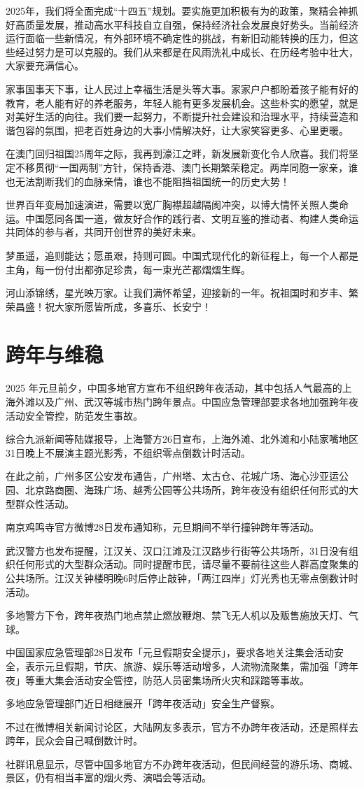 2025年，我们将全面完成“十四五”规划。要实施更加积极有为的政策，聚精会神抓好高质量发展，推动高水平科技自立自强，保持经济社会发展良好势头。当前经济运行面临一些新情况，有外部环境不确定性的挑战，有新旧动能转换的压力，但这些经过努力是可以克服的。我们从来都是在风雨洗礼中成长、在历经考验中壮大，大家要充满信心。

家事国事天下事，让人民过上幸福生活是头等大事。家家户户都盼着孩子能有好的教育，老人能有好的养老服务，年轻人能有更多发展机会。这些朴实的愿望，就是对美好生活的向往。我们要一起努力，不断提升社会建设和治理水平，持续营造和谐包容的氛围，把老百姓身边的大事小情解决好，让大家笑容更多、心里更暖。

在澳门回归祖国25周年之际，我再到濠江之畔，新发展新变化令人欣喜。我们将坚定不移贯彻“一国两制”方针，保持香港、澳门长期繁荣稳定。两岸同胞一家亲，谁也无法割断我们的血脉亲情，谁也不能阻挡祖国统一的历史大势！

世界百年变局加速演进，需要以宽广胸襟超越隔阂冲突，以博大情怀关照人类命运。中国愿同各国一道，做友好合作的践行者、文明互鉴的推动者、构建人类命运共同体的参与者，共同开创世界的美好未来。

梦虽遥，追则能达；愿虽艰，持则可圆。中国式现代化的新征程上，每一个人都是主角，每一份付出都弥足珍贵，每一束光芒都熠熠生辉。

河山添锦绣，星光映万家。让我们满怀希望，迎接新的一年。祝祖国时和岁丰、繁荣昌盛！祝大家所愿皆所成，多喜乐、长安宁！

\section{跨年与维稳}

2025 年元旦前夕，中国多地官方宣布不组织跨年夜活动，其中包括人气最高的上海外滩以及广州、武汉等城市热门跨年景点。中国应急管理部要求各地加强跨年夜活动安全管控，防范发生事故。

综合九派新闻等陆媒报导，上海警方26日宣布，上海外滩、北外滩和小陆家嘴地区31日晚上不展演主题光影秀，不组织零点倒数计时活动。

在此之前，广州多区公安发布通告，广州塔、太古仓、花城广场、海心沙亚运公园、北京路商圈、海珠广场、越秀公园等公共场所，跨年夜没有组织任何形式的大型群众性活动。

南京鸡鸣寺官方微博28日发布通知称，元旦期间不举行撞钟跨年等活动。

武汉警方也发布提醒，江汉关、汉口江滩及江汉路步行街等公共场所，31日没有组织任何形式的大型群众活动。同时提醒市民，请尽量不要前往这些人群高度聚集的公共场所。江汉关钟楼明晚6时后停止敲钟，「两江四岸」灯光秀也无零点倒数计时活动。

多地警方下令，跨年夜热门地点禁止燃放鞭炮、禁飞无人机以及贩售施放天灯、气球。

中国国家应急管理部28日发布「元旦假期安全提示」，要求各地关注集会活动安全，表示元旦假期，节庆、旅游、娱乐等活动增多，人流物流聚集，需加强「跨年夜」等重大集会活动安全管控，防范人员密集场所火灾和踩踏等事故。

多地应急管理部门近日相继展开「跨年夜活动」安全生产督察。

不过在微博相关新闻讨论区，大陆网友多表示，官方不办跨年夜活动，还是照样去跨年，民众会自己喊倒数计时。

社群讯息显示，尽管中国多地官方不办跨年夜活动，但民间经营的游乐场、商城、景区，仍有相当丰富的烟火秀、演唱会等活动。 